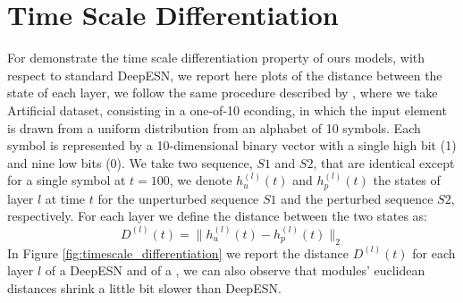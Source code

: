 \section{Time Scale Differentiation}
For demonstrate the time scale differentiation property of ours models, 
with respect to standard DeepESN, we report here plots of the distance between the state of each layer, we follow the same procedure
described by \cite{GALLICCHIO201787}, where we take Artificial dataset, consisting in a one-of-10 econding, in which the input element is drawn 
from a uniform distribution from an alphabet of 10 symbols. Each symbol is represented by a 10-dimensional binary vector with a single high bit (1) and nine low bits (0).
We take two sequence, $S1$ and $S2$, that are identical except for a single symbol at $t=100$, we denote 
$h_u^{(l)}(t)$ and $h_p^{(l)}(t)$ the states of layer $l$ at time $t$ for the unperturbed sequence $S1$ and the perturbed sequence $S2$, respectively.
For each layer we define the distance between the two states as:
\[
D^{(l)}(t) = \| h_u^{(l)}(t) - h_p^{(l)}(t) \|_2
\]
In Figure \ref{fig:timescale_differentiation} we report the distance $D^{(l)}(t)$ 
for each layer $l$ of a DeepESN and of a  \DCR, we can also observe that  modules' euclidean distances shrink a little bit slower than DeepESN.
 
